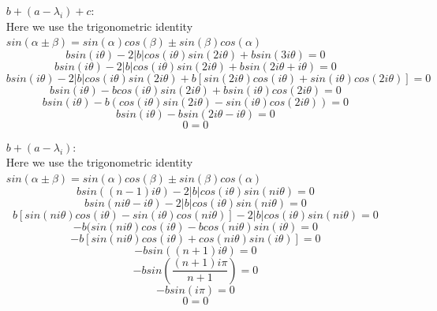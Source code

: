 \documentclass[11pt,a4paper]{article}
\begin{document}
\begin{itemize}
\begin{enumerate} [label={\alph*)}]
\begin{enumerate}
						\item [$b + (a - \lambda_i) + c$:] ~
						\\ Here we use the trigonometric identity $sin(\alpha \pm \beta) = sin(\alpha)cos(\beta) \pm sin(\beta)cos(\alpha)$
						$$bsin(i\theta)-2\vert b \vert cos(i\theta)sin(2i\theta) + b sin(3i\theta) = 0$$
						$$bsin(i\theta)-2\vert b \vert cos(i\theta)sin(2i\theta) + b sin(2i\theta + i\theta) = 0$$
						$$bsin(i\theta)-2\vert b \vert cos(i\theta)sin(2i\theta) + b [sin(2i\theta)cos(i\theta) + sin(i\theta)cos(2i\theta)] = 0$$
						$$bsin(i\theta)-bcos(i\theta)sin(2i\theta) + bsin(i\theta)cos(2i\theta) = 0$$
						$$bsin(i\theta)-b(cos(i\theta)sin(2i\theta) - sin(i\theta)cos(2i\theta)) = 0$$
						$$bsin(i\theta)-bsin(2i\theta - i\theta) = 0$$
						$$ 0 = 0$$
						
						\item [$b + (a - \lambda_i)$:] ~
						\\ Here we use the trigonometric identity $sin(\alpha \pm \beta) = sin(\alpha)cos(\beta) \pm sin(\beta)cos(\alpha)$
						$$bsin((n-1)i\theta)-2\vert b \vert cos(i\theta)sin(ni\theta) = 0$$
						$$bsin(ni\theta - i\theta)-2\vert b \vert cos(i\theta)sin(ni\theta) = 0$$
						$$b[sin(ni\theta)cos(i\theta)-sin(i\theta)cos(ni\theta)]-2\vert b \vert cos(i\theta)sin(ni\theta) = 0$$
						$$-b(sin(ni\theta)cos(i\theta)- bcos(ni\theta)sin(i\theta) = 0$$
						$$-b[sin(ni\theta)cos(i\theta) + cos(ni\theta)sin(i\theta)] = 0$$
						$$-bsin((n+1)i\theta) = 0$$
						$$-bsin(\frac{(n+1)i\pi}{n+1}) = 0$$
						$$-bsin(i\pi) = 0$$
						$$ 0 = 0$$
							

\end{enumerate}
\end{enumerate}
\end{itemize}
\end{document}
